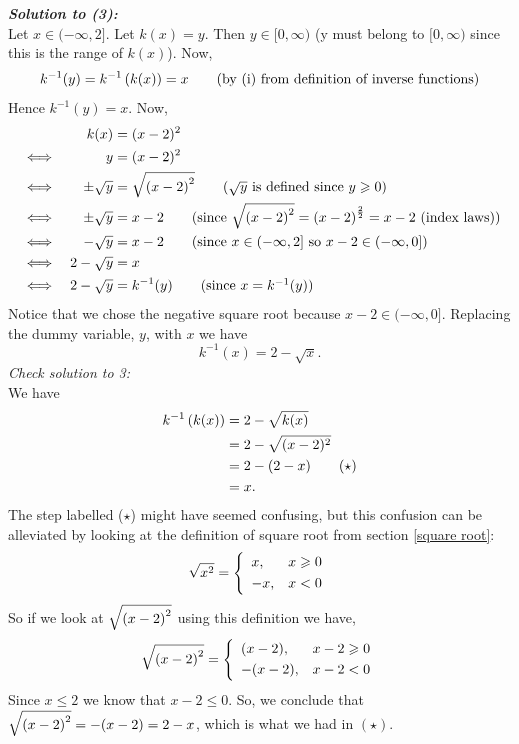 \bigskip
\noindent \textbf{\textit{Solution to (3):}} \\
Let $x \in (-\infty,2]$. Let $k(x) = y$. Then $y \in [0,\infty)$ (y must belong to $[0,\infty)$ since this is the range of $k(x)$). Now,
\[
k^{-1}(y) = k^{-1}\left(k(x)\right) = x \tag{by (i) from definition of inverse functions}
\]
Hence $k^{-1}(y) = x$. Now,
\begin{alignat*}{2}
&& k(x)
&  = (x-2)^2 \\
& \iff
& y
& = (x-2)^2  \\
& \iff
& \pm\sqrt{y}
& = \sqrt{\brac{x - 2}^2} \tag{$\sqrt{y}$ is defined since $y\geq0$} \\
& \iff
& \pm\sqrt{y}
& = x - 2 \tag{since $\sqrt{\brac{x - 2}^2} = \brac{x - 2}^\frac{2}{2} = x - 2$ (index laws)} \\
& \iff
& - \sqrt{y}
& = x - 2 \tag{since $x \in (-\infty,2]$ so $x-2 \in (-\infty,0]$} \\
& \iff
& 2-\sqrt{y}
& = x \\
& \iff 
& 2 - \sqrt{y} 
& = k^{-1}(y) \tag{since $x = k^{-1}(y)$}
\end{alignat*}
Notice that we chose the negative square root because $x - 2 \in (-\infty,0]$. Replacing the dummy variable, $y$, with $x$ we have
\[
k^{-1}(x) = 2 - \sqrt{x}.
\]
\noindent\textit{Check solution to 3:} \\
We have
\begin{align*}
k^{-1}\left(k(x)\right) & = 2 - \sqrt{k(x)} \\
			     & = 2 - \sqrt{(x-2)^2} \\
			     & = 2 - (2-x) \tag{$\star$} \\
			     & = x.
\end{align*}
The step labelled ($\star$) might have seemed confusing, but this confusion can be alleviated by looking at the definition of square root from section \ref{square root}:
\[
\scases{\sqrt{x^2}}{x}{x \geq 0}{-x}{x < 0}
\]
So if we look at $\sqrt{\left(x-2\right)^2}$ using this definition we have,
\[
\scases{\sqrt{\brac{x-2}^2}}{(x-2)}{x-2\geq0}{-(x-2)}{x-2 < 0}
\]
Since $x \leq 2$ we know that $x-2 \leq 0$. So, we conclude that $\sqrt{\left(x-2\right)^2} = -(x-2) = 2-x$, which is what we had in $(\star)$. \\

